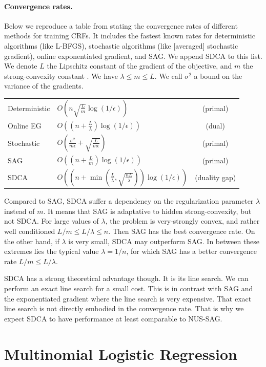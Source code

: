 \documentclass{article}
\DeclareMathOperator{\1}{\mathbb{1}}
\begin{document}
\paragraph{Convergence rates.}
Below we reproduce a table from \cite{schmidt_non-uniform_2015} stating the convergence rates of different methods for training CRFs.
It includes the fastest known rates for deterministic algorithms (like L-BFGS), stochastic algorithms (like [averaged] stochastic gradient), online exponentiated gradient, and SAG.
We append SDCA to this list.
We denote $L$ the Lipschitz constant of the gradient of the objective, and $m$ the strong-convexity constant .
We have $\lambda \leq m \leq L$.
We call $\sigma^2$ a bound on the variance of the gradients.\\
\begin{center}
\begin{tabular}{llc}
Deterministic & $O(n\sqrt{\frac{L}{m}}\log(1/\epsilon))$ & (primal)\\
Online EG & $O((n + \frac{L}{\lambda})\log(1/\epsilon))$ & (dual)\\
Stochastic & $O(\frac{\sigma^2}{m \epsilon}+\sqrt{\frac{L}{m \epsilon}})$ & (primal)\\
SAG & $O((n + \frac{L}{m})\log(1/\epsilon))$ & (primal) \\
SDCA & $O( (n + \min( \frac{L}{\lambda}, \sqrt{\frac{n L}{\lambda}}) ) \log(1/\epsilon) )$ & (duality gap)
\end{tabular}
\end{center}
Compared to SAG, SDCA suffer a dependency on the regularization parameter $\lambda$ instead of $m$.
It means that SAG is adaptative to  hidden strong-convexity, but not SDCA.
For large values of $\lambda$, the problem is very-strongly convex, and rather well  conditioned $L/m \leq L/\lambda \leq n$.
Then SAG has the best convergence rate.
On the other hand, if $\lambda$ is very small, SDCA may outperform SAG.
In between these extremes lies the typical value $\lambda=1/n$, for which SAG has a better convergence rate $L/m \leq L/\lambda $.

SDCA has a strong theoretical advantage though.
It is its line search.
We can perform an exact line search for a small cost.
This is in contrast with SAG and the exponentiated gradient where the line search is very expensive.
That exact line search is not directly embodied in the convergence rate.
That is why we expect SDCA to have performance at least comparable to NUS-SAG.
 

\section{Multinomial Logistic Regression}
\end{document}
